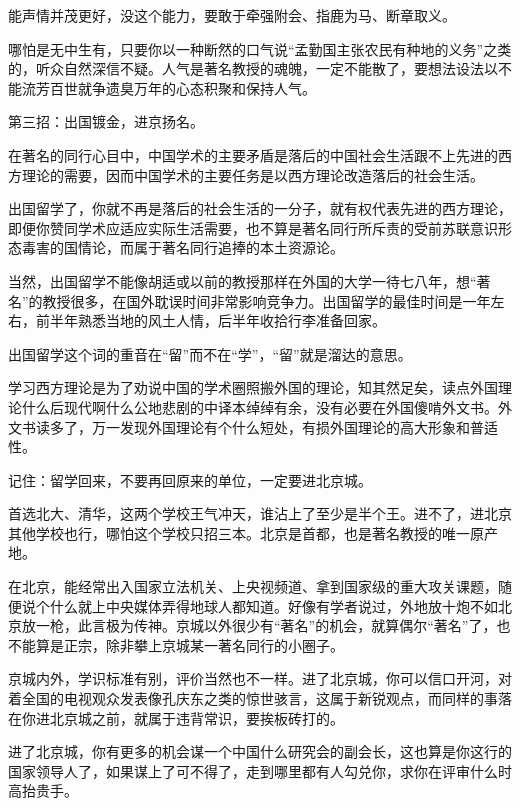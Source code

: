 能声情并茂更好，没这个能力，要敢于牵强附会、指鹿为马、断章取义。

哪怕是无中生有，只要你以一种断然的口气说“孟勤国主张农民有种地的义务”之类的，听众自然深信不疑。人气是著名教授的魂魄，一定不能散了，要想法设法以不能流芳百世就争遗臭万年的心态积聚和保持人气。





第三招：出国镀金，进京扬名。      

在著名的同行心目中，中国学术的主要矛盾是落后的中国社会生活跟不上先进的西方理论的需要，因而中国学术的主要任务是以西方理论改造落后的社会生活。

出国留学了，你就不再是落后的社会生活的一分子，就有权代表先进的西方理论，即便你赞同学术应适应实际生活需要，也不算是著名同行所斥责的受前苏联意识形态毒害的国情论，而属于著名同行追捧的本土资源论。

当然，出国留学不能像胡适或以前的教授那样在外国的大学一待七八年，想“著名”的教授很多，在国外耽误时间非常影响竞争力。出国留学的最佳时间是一年左右，前半年熟悉当地的风土人情，后半年收拾行李准备回家。

出国留学这个词的重音在“留”而不在“学”，“留”就是溜达的意思。



学习西方理论是为了劝说中国的学术圈照搬外国的理论，知其然足矣，读点外国理论什么后现代啊什么公地悲剧的中译本绰绰有余，没有必要在外国傻啃外文书。外文书读多了，万一发现外国理论有个什么短处，有损外国理论的高大形象和普适性。

记住：留学回来，不要再回原来的单位，一定要进北京城。

首选北大、清华，这两个学校王气冲天，谁沾上了至少是半个王。进不了，进北京其他学校也行，哪怕这个学校只招三本。北京是首都，也是著名教授的唯一原产地。

在北京，能经常出入国家立法机关、上央视频道、拿到国家级的重大攻关课题，随便说个什么就上中央媒体弄得地球人都知道。好像有学者说过，外地放十炮不如北京放一枪，此言极为传神。京城以外很少有“著名”的机会，就算偶尔“著名”了，也不能算是正宗，除非攀上京城某一著名同行的小圈子。




京城内外，学识标准有别，评价当然也不一样。进了北京城，你可以信口开河，对着全国的电视观众发表像孔庆东之类的惊世骇言，这属于新锐观点，而同样的事落在你进北京城之前，就属于违背常识，要挨板砖打的。

进了北京城，你有更多的机会谋一个中国什么研究会的副会长，这也算是你这行的国家领导人了，如果谋上了可不得了，走到哪里都有人勾兑你，求你在评审什么时高抬贵手。

